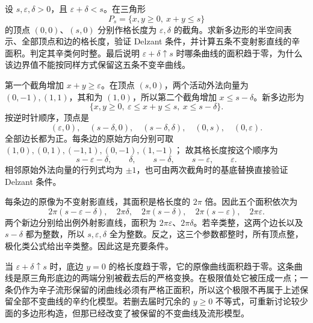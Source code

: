 \begin{exercise}\label{g4:ex:1205:two-corner-cuts}
	设 \(s,\varepsilon,\delta>0\)，且 \(\varepsilon+\delta<s\)。在三角形
	\[
		P_s=\{x,y\ge0,\ x+y\le s\}
	\]
	的顶点 \((0,0)\)、\((s,0)\) 分别作格长度为 \(\varepsilon,\delta\) 的截角。求新多边形的半空间表示、全部顶点和边的格长度，验证 Delzant 条件，并计算五条不变射影直线的辛面积。判定其辛类何时整。最后说明 \(\varepsilon+\delta\uparrow s\) 时哪条曲线的面积趋于零，为什么该边界值不能按同样方式保留这五条不变辛曲线。
\end{exercise}
\begin{solution}
	第一个截角增加 \(x+y\ge\varepsilon\)。在顶点 \((s,0)\)，两个活动外法向量为 \((0,-1),(1,1)\)，其和为 \((1,0)\)，所以第二个截角增加 \(x\le s-\delta\)。新多边形为
	\[
		\{x,y\ge0,\ \varepsilon\le x+y\le s,\ x\le s-\delta\}.
	\]
	按逆时针顺序，顶点是
	\[
		(\varepsilon,0),\quad(s-\delta,0),\quad
		(s-\delta,\delta),\quad(0,s),\quad(0,\varepsilon).
	\]
	全部边长都为正。每条边的原始方向分别可取
	\((1,0),(0,1),(-1,1),(0,-1),(1,-1)\)；
	故其格长度按这个顺序为
	\[
		s-\varepsilon-\delta,\qquad \delta,\qquad
		s-\delta,\qquad s-\varepsilon,\qquad \varepsilon.
	\]
	相邻原始外法向量的行列式均为 \(\pm1\)，也可由两次截角时的基底替换直接验证 Delzant 条件。

	每条边的原像为不变射影直线，其面积是格长度的 \(2\pi\) 倍。因此五个面积依次为
	\[
		2\pi(s-\varepsilon-\delta),\quad 2\pi\delta,\quad
		2\pi(s-\delta),\quad2\pi(s-\varepsilon),\quad2\pi\varepsilon.
	\]
	两个新边分别给出例外射影直线，面积为
	\(2\pi\varepsilon\)、\(2\pi\delta\)。若辛类整，这两个边长以及 \(s-\delta\) 都为整数，所以 \(s,\varepsilon,\delta\) 全为整数。反之，这三个参数都整时，所有顶点整，极化类公式给出辛类整。因此这是充要条件。

	当 \(\varepsilon+\delta\uparrow s\) 时，底边 \(y=0\) 的格长度趋于零，它的原像曲线面积趋于零。这条曲线是原三角形底边的两端分别被截去后的严格变换。在极限值处它被压成一点；一条仍作为辛子流形保留的闭曲线必须有严格正面积，所以这个极限不再属于上述保留全部不变曲线的辛约化模型。若删去届时冗余的 \(y\ge0\) 不等式，可重新讨论较少面的多边形构造，但那已经改变了被保留的不变曲线及流形模型。
\end{solution}

